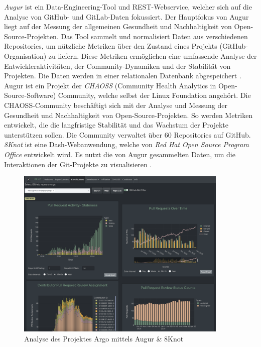 \textit{Augur} ist ein Data-Engineering-Tool und REST-Webservice, welcher sich auf die Analyse von GitHub- und GitLab-Daten fokussiert. Der Hauptfokus von Augur liegt auf der Messung der allgemeinen Gesundheit und Nachhaltigkeit von Open-Source-Projekten. Das Tool sammelt und normalisiert Daten aus verschiedenen Repositories, um nützliche Metriken über den Zustand eines Projekts (GitHub-Organi\-sation) zu liefern. Diese Metriken ermöglichen eine umfassende Analyse der Entwickleraktivitäten, der Community-Dynamiken und der Stabilität von Projekten. Die Daten werden in einer relationalen Datenbank abgespeichert \parencite{noauthor_chaossaugur_nodate}. Augur ist ein Projekt der \textit{CHAOSS} (Community Health Analytics in Open-Source-Software) Community, welche selbst der Linux Foundation angehört. Die CHAOSS-Community beschäftigt sich mit der Analyse und Messung der Gesundheit und Nachhaltigkeit von Open-Source-Projekten. So werden Metriken entwickelt, die die langfristige Stabilität und das Wachstum der Projekte unterstützen sollen. Die Community verwaltet über 60 Repositories auf GitHub. \parencite{noauthor_chaoss_nodate} \parencite{noauthor_about_nodate-1}
\newpage
\textit{8Knot} ist eine Dash-Webanwendung, welche von \textit{Red Hat Open Source Program Office} entwickelt wird. Es nutzt die von Augur gesammelten Daten, um die Interaktionen der Git-Projekte zu visualisieren \parencite{noauthor_chaossaugur_nodate} \parencite{noauthor_oss-aspen8knot_2025}. 
\begin{figure}[htbp]
    \centering
    \includegraphics[width=0.9\textwidth]{Figures/augur-8knot.png}
    \caption{Analyse des Projektes Argo mittels Augur \& 8Knot \parencite{noauthor_metrixchaossio_nodate} \parencite{noauthor_argoprojargo-workflows_2025}}
    \label{fig:augur-8knot}
\end{figure}


